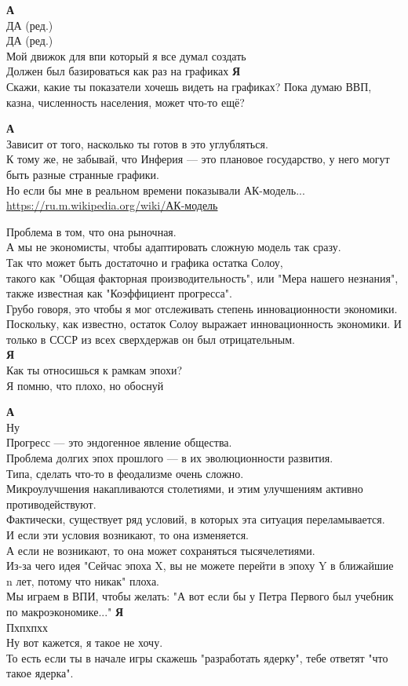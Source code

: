 \begin{tabbing}
\textbf{А} \\
ДА (ред.) \\
ДА (ред.) \\
Мой движок для впи который я все думал создать \\
Должен был базироваться как раз на графиках
\textbf{Я} \\
Скажи, какие ты показатели хочешь видеть на графиках? Пока думаю ВВП, казна, численность населения, может что-то ещё?

\textbf{А} \\
Зависит от того, насколько ты готов в это углубляться. \\
К тому же, не забывай, что Инферия — это плановое государство, у него могут быть разные странные графики. \\
Но если бы мне в реальном времени показывали АК-модель... \\
\url{https://ru.m.wikipedia.org/wiki/АК-модель}

Проблема в том, что она рыночная. \\
А мы не экономисты, чтобы адаптировать сложную модель так сразу. \\
Так что может быть достаточно и графика остатка Солоу, \\
такого как "Общая факторная производительность", или "Мера нашего незнания", также известная как "Коэффициент прогресса". \\
Грубо говоря, это чтобы я мог отслеживать степень инновационности экономики. \\
Поскольку, как известно, остаток Солоу выражает инновационность экономики. И только в СССР из всех сверхдержав он был отрицательным.\\
\textbf{Я} \\
Как ты относишься к рамкам эпохи? \\
Я помню, что плохо, но обоснуй

\textbf{А} \\
Ну \\
Прогресс — это эндогенное явление общества. \\
Проблема долгих эпох прошлого — в их эволюционности развития. \\
Типа, сделать что-то в феодализме очень сложно. \\
Микроулучшения накапливаются столетиями, и этим улучшениям активно противодействуют. \\
Фактически, существует ряд условий, в которых эта ситуация переламывается. \\
И если эти условия возникают, то она изменяется. \\
А если не возникают, то она может сохраняться тысячелетиями. \\
Из-за чего идея "Сейчас эпоха X, вы не можете перейти в эпоху Y в ближайшие n лет, потому что никак" плоха. \\
Мы играем в ВПИ, чтобы желать: "А вот если бы у Петра Первого был учебник по макроэкономике..."
\textbf{Я} \\
Пхпхпхх \\
Ну вот кажется, я такое не хочу. \\
То есть если ты в начале игры скажешь "разработать ядерку", тебе ответят "что такое ядерка".


\end{tabbing}

